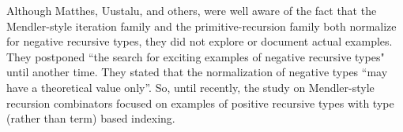 Although Matthes, Uustalu, and others, were well aware of the fact that
the Mendler-style iteration family and the primitive-recursion family both
normalize for negative recursive types, they did not explore or document actual
examples. They postponed ``the search for exciting examples of negative
recursive types" until another time. They stated that the normalization
of negative types ``may have a theoretical value
only''\cite{UusVen99}. So, until recently, the study on Mendler-style recursion
combinators focused on examples of positive recursive types with type (rather than term) based indexing.


